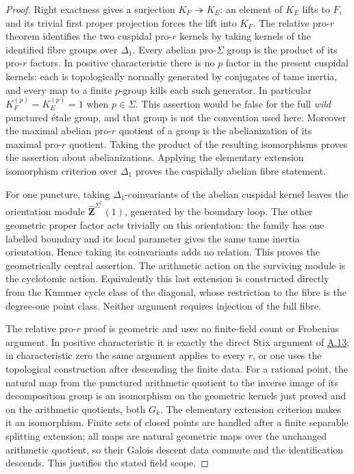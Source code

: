 \documentclass[11pt,a4paper]{article}
\newcommand{\Z}{\mathbf Z}
\newcommand{\statementref}[1]{\hyperlink{#1}{#1}}
\begin{document}
\begin{proof}
Right exactness gives a surjection $K_F\twoheadrightarrow K_E$:
an element of $K_E$ lifts to $F$, and its trivial first proper projection
forces the lift into $K_F$. The relative pro-$r$ theorem identifies the
two cuspidal pro-$r$ kernels by taking kernels of the identified fibre
groups over $\Delta_1$. Every abelian pro-$\Sigma$ group is the product
of its pro-$r$ factors. In positive characteristic there is no $p$
factor in the present cuspidal
kernels: each is topologically normally generated by conjugates of
tame inertia, and every map to a finite $p$-group kills each such
generator. In particular $K_F^{(p)}=K_E^{(p)}=1$ when $p\in\Sigma$.
This assertion would be false for the full \emph{wild} punctured
\'etale group, and that group is not the convention used here.
Moreover the maximal abelian pro-$r$ quotient of
a group is the abelianization of its maximal pro-$r$ quotient. Taking
the product of the resulting isomorphisms proves the assertion about
abelianizations. Applying the elementary extension isomorphism criterion
over $\Delta_1$ proves the cuspidally abelian fibre statement.

For one puncture, taking $\Delta_1$-coinvariants of the abelian cuspidal
kernel leaves the orientation module
$\widehat{\Z}^{\Sigma^\dagger}(1)$, generated by the boundary loop. The other
geometric proper factor acts trivially on this orientation: the family
has one labelled boundary and its local parameter gives the same tame
inertia orientation. Hence taking its coinvariants adds no relation.
This proves the geometrically central assertion. The arithmetic action
on the surviving module is the cyclotomic action. Equivalently this
last extension is constructed directly from the Kummer cycle class of
the diagonal, whose restriction to the fibre is the degree-one point
class. Neither argument requires injection of the full fibre.

The relative pro-$r$ proof is geometric and uses no finite-field
count or Frobenius argument. In positive characteristic it is
exactly the direct Stix argument of \statementref{A.13}; in
characteristic zero the same argument applies to every $r$, or
one uses the topological construction after descending the finite
data. For a rational point, the natural map from the punctured
arithmetic quotient to the inverse image of its decomposition
group is an isomorphism on the geometric kernels just proved and
on the arithmetic quotients, both $G_k$. The elementary extension
criterion makes it an isomorphism. Finite sets of closed points
are handled after a finite separable splitting extension; all
maps are natural geometric maps over the unchanged arithmetic
quotient, so their Galois descent data commute and the
identification descends. This justifies the stated field scope.
\end{proof}
\end{document}
